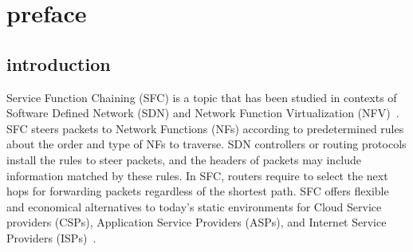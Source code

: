 \chapter{preface}
\label{chap:introduction}


\section{introduction}
\label{section:background}
Service Function Chaining (SFC) is a topic that has been studied in contexts of Software Defined Network (SDN) and Network Function Virtualization (NFV)~\cite{nfv,sfc-on-sdn-nfv-servey,sfc-on-sdn-scenario,imple-sfc-with-openflow}.
SFC steers packets to Network Functions (NFs) according to predetermined rules about the order and type of NFs to traverse.
SDN controllers or routing protocols install the rules to steer packets, and the headers of packets may include information matched by these rules.
In SFC, routers require to select the next hops for forwarding packets regardless of the shortest path.
SFC offers flexible and economical alternatives to today's static environments for Cloud Service providers (CSPs), Application Service Providers (ASPs), and Internet Service Providers (ISPs)~\cite{survey-on-sfc}.

